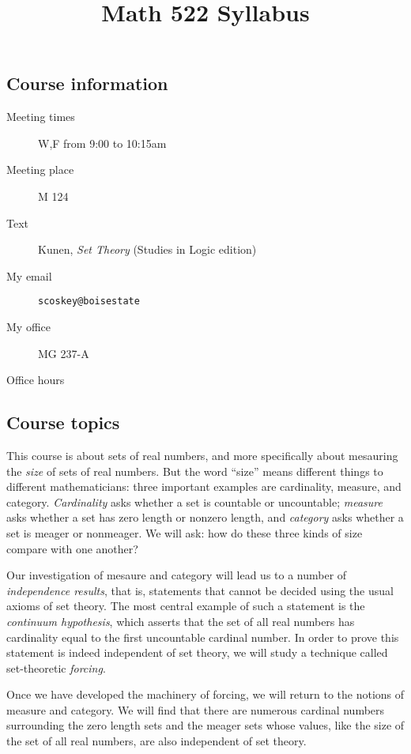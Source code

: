 \documentclass[12pt,oneside]{amsart}
\title{Math 522 Syllabus}
\begin{document}
\maketitle
\thispagestyle{empty}

\subsection*{Course information}
\begin{description}
\item[Meeting times] W,F from 9:00 to 10:15am
\item[Meeting place] M 124
\item[Text] Kunen, \emph{Set Theory} (Studies in Logic edition)
\item[My email] \texttt{scoskey@boisestate}
\item[My office] MG 237-A
\item[Office hours] \underline{\hspace{1in}}
\end{description}

\subsection*{Course topics}

This course is about sets of real numbers, and more specifically about mesauring the \emph{size} of sets of real numbers. But the word ``size'' means different things to different mathematicians: three important examples are cardinality, measure, and category. \emph{Cardinality} asks whether a set is countable or uncountable; \emph{measure} asks whether a set has zero length or nonzero length, and \emph{category} asks whether a set is meager or nonmeager. We will ask: how do these three kinds of size compare with one another?

Our investigation of mesaure and category will lead us to a number of \emph{independence results}, that is, statements that cannot be decided using the usual axioms of set theory. The most central example of such a statement is the \emph{continuum hypothesis}, which asserts that the set of all real numbers has cardinality equal to the first uncountable cardinal number. In order to prove this statement is indeed independent of set theory, we will study a technique called set-theoretic \emph{forcing}.

Once we have developed the machinery of forcing, we will return to the notions of measure and category. We will find that there are numerous cardinal numbers surrounding the zero length sets and the meager sets whose values, like the size of the set of all real numbers, are also independent of set theory.
\end{document}
